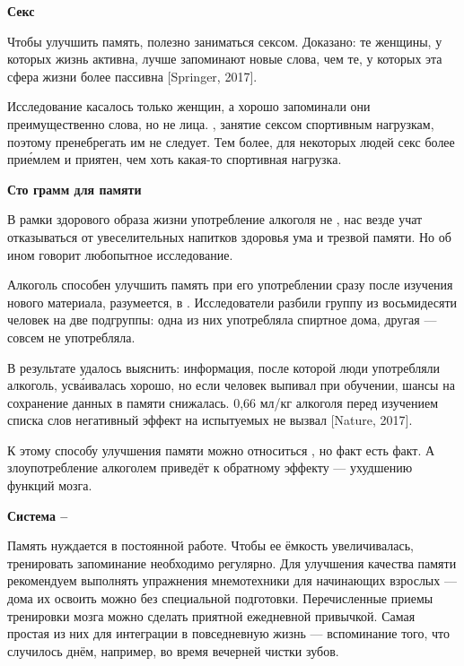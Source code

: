 \textbf{Секс}

Чтобы улучшить память, полезно заниматься сексом. Доказано: те женщины, у которых  жизнь активна, лучше запоминают новые слова, чем те, у которых эта сфера жизни более пассивна [Springer, 2017].

Исследование касалось только женщин, а хорошо запоминали они преимущественно слова, но не лица. , занятие сексом  спортивным нагрузкам, поэтому пренебрегать им не следует. Тем более, для некоторых людей секс более при\'{е}млем и приятен, чем хоть какая-то спортивная нагрузка.

\textbf{Сто грамм для памяти}

В рамки здорового образа жизни употребление алкоголя не , нас везде учат отказываться от увеселительных напитков  здоровья ума и трезвой памяти. Но об ином говорит любопытное исследование.

Алкоголь способен улучшить память при его употреблении сразу после изучения нового материала, разумеется, в  . Исследователи разбили группу из восьмидесяти человек на две подгруппы: одна из них употребляла спиртное дома, другая --- совсем не употребляла.

В результате удалось выяснить: информация, после  которой люди употребляли алкоголь, усв\'{а}ивалась хорошо, но если человек выпивал при обучении, шансы на сохранение данных в памяти  снижалась.  0,66 мл/кг алкоголя перед изучением списка слов негативный эффект на испытуемых не вызвал [Nature, 2017].

К этому способу улучшения памяти можно относиться , но факт есть факт. А злоупотребление алкоголем приведёт к обратному эффекту --- ухудшению функций мозга.

\textbf{Система – }

Память нуждается в постоянной работе. Чтобы ее ёмкость увеличивалась, тренировать запоминание необходимо регулярно. Для  улучшения качества памяти рекомендуем выполнять упражнения мнемотехники для начинающих взрослых --- дома их освоить можно без специальной подготовки. Перечисленные приемы тренировки мозга можно сделать приятной ежедневной привычкой. Самая простая из них для интеграции в повседневную жизнь --- вспоминание того, что случилось днём, например, во время вечерней чистки зубов.

